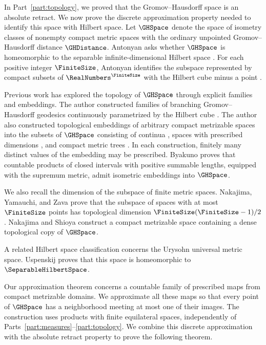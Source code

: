 In Part~\ref{part:topology},
we proved that the Gromov--Hausdorff space
is an absolute retract.
We now prove the discrete approximation property needed to identify
this space with Hilbert space.
Let
$\GHSpace$
denote the space of isometry classes of nonempty compact metric spaces
with the ordinary unpointed Gromov--Hausdorff distance
$\GHDistance$.
Antonyan asks whether
$\GHSpace$
is homeomorphic to the separable
infinite-dimensional Hilbert space
\cite[p.~2]{Antonyan2020Euclidean}.
For each positive integer
$\FiniteSize $,
Antonyan identifies the subspace represented by compact subsets of
$\RealNumbers^\FiniteSize $
with the Hilbert cube minus a point
\cite[Corollary~5.3]{Antonyan2021Euclidean}.

Previous work has explored the topology of $\GHSpace$ through explicit
families and embeddings.
The author constructed families of branching Gromov--Hausdorff geodesics
continuously parametrized by the Hilbert cube
\cite[Theorem~1.3]{Ishiki2022Branching}.
The author also constructed topological embeddings of arbitrary compact metrizable
spaces into the subsets of
$\GHSpace$
consisting of continua
\cite[Theorem~1.1]{Ishiki2022Continua},
spaces with prescribed dimensions
\cite[Theorem~1.3]{Ishiki2023FractalDimensions},
and compact metric trees
\cite[Theorem~1.1]{Ishiki2023MetricTrees}.
In each construction,
finitely many distinct values of the embedding may be prescribed.
Byakuno
\cite[arXiv v1, Corollary~1.4]{Byakuno2026Embedding}
proves that countable products of closed intervals with positive summable lengths,
equipped with the supremum metric,
admit isometric embeddings into
$\GHSpace$.

We also recall the dimension of the subspace of finite metric spaces.
Nakajima,
Yamauchi,
and Zava
\cite[arXiv v1, Theorem~A]{NakajimaYamauchiZava2025}
prove that the subspace of spaces with at most
$\FiniteSize$
points has topological dimension
$\FiniteSize(\FiniteSize-1)/2$.
Nakajima and Shioya
\cite[arXiv v1, Main Theorem~1.2]{NakajimaShioyaCompactification}
construct a compact metrizable space containing a dense topological copy of
$\GHSpace$.

A related Hilbert space classification concerns the Urysohn universal
metric space.
Uspenskij
\cite[arXiv v1, Theorem~2.1]{Uspenskij2004Urysohn}
proves that this space is homeomorphic to
$\SeparableHilbertSpace$.

Our approximation theorem concerns a countable family of prescribed maps
from compact metrizable domains.
We approximate all these maps so that every point of
$\GHSpace$
has a neighborhood meeting at most one of their images.
The construction uses products with finite equilateral spaces,
independently of Parts~\ref{part:measures}--\ref{part:topology}.
We combine this discrete approximation with the absolute retract property
to prove the following theorem.

